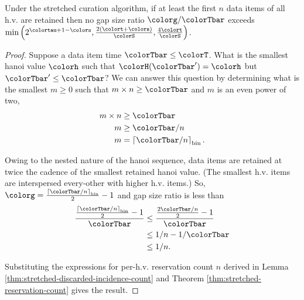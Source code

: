 \begin{theorem}
\label{thm:stretched-gap-size}
Under the stretched curation algorithm, if at least the first $n$ data items of all h.v. are retained then no gap size ratio $\colorg/\colorTbar$ exceeds $\min\Big(
  2^{\colortau+1-\colors}
  ,
  \frac{2(\colort + \colors)}{\colorS},
  \frac{4\colort}{\colorS}
\Big)$.
\end{theorem}
\begin{proof}

Suppose a data item time $\colorTbar \leq \colorT$.
What is the smallest hanoi value $\colorh$ such that $\colorH(\colorTbar') = \colorh$ but $\colorTbar' \leq \colorTbar$?
We can answer this question by determining what is the smallest $m \geq 0$ such that $m \times n \geq \colorTbar$ and $m$ is an even power of two,
\begin{align*}
m \times n
&\geq \colorTbar\\
m
&\geq \colorTbar / n\\
m
&= \left\lceil \colorTbar / n \right\rceil_{\mathrm{bin}}.
\end{align*}

Owing to the nested nature of the hanoi sequence, data items are retained at twice the cadence of the smallest retained hanoi value.
(The smallest h.v. items are interspersed every-other with higher h.v. items.)
So, $\colorg = \frac{\left\lceil \colorTbar / n \right\rceil_{\mathrm{bin}}}{2} - 1$ and gap size ratio is less than
\begin{align*}
\frac{
\frac{\left\lceil \colorTbar / n \right\rceil_{\mathrm{bin}}}{2} - 1
}{
\colorTbar
}
&\leq
\frac{
\frac{2\colorTbar / n}{2} - 1
}{
\colorTbar
}\\
&\leq
1 / n - 1 / \colorTbar\\
&\leq
1 / n.
\end{align*}

Substituting the expressions for per-h.v. reservation count $n$ derived in Lemma \ref{thm:stretched-discarded-incidence-count} and Theorem \ref{thm:stretched-reservation-count} gives the result.
\end{proof}

